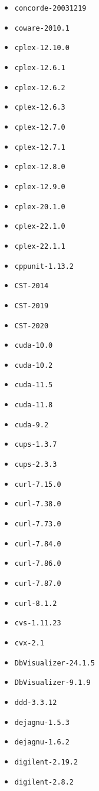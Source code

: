 \begin{multicols}{3}
\begin{itemize}
\item \verb|concorde-20031219|
\item \verb|coware-2010.1|
\item \verb|cplex-12.10.0|
\item \verb|cplex-12.6.1|
\item \verb|cplex-12.6.2|
\item \verb|cplex-12.6.3|
\item \verb|cplex-12.7.0|
\item \verb|cplex-12.7.1|
\item \verb|cplex-12.8.0|
\item \verb|cplex-12.9.0|
\item \verb|cplex-20.1.0|
\item \verb|cplex-22.1.0|
\item \verb|cplex-22.1.1|
\item \verb|cppunit-1.13.2|
\item \verb|CST-2014|
\item \verb|CST-2019|
\item \verb|CST-2020|
\item \verb|cuda-10.0|
\item \verb|cuda-10.2|
\item \verb|cuda-11.5|
\item \verb|cuda-11.8|
\item \verb|cuda-9.2|
\item \verb|cups-1.3.7|
\item \verb|cups-2.3.3|
\item \verb|curl-7.15.0|
\item \verb|curl-7.38.0|
\item \verb|curl-7.73.0|
\item \verb|curl-7.84.0|
\item \verb|curl-7.86.0|
\item \verb|curl-7.87.0|
\item \verb|curl-8.1.2|
\item \verb|cvs-1.11.23|
\item \verb|cvx-2.1|
\item \verb|DbVisualizer-24.1.5|
\item \verb|DbVisualizer-9.1.9|
\item \verb|ddd-3.3.12|
\item \verb|dejagnu-1.5.3|
\item \verb|dejagnu-1.6.2|
\item \verb|digilent-2.19.2|
\item \verb|digilent-2.8.2|

\end{itemize}
\end{multicols}
